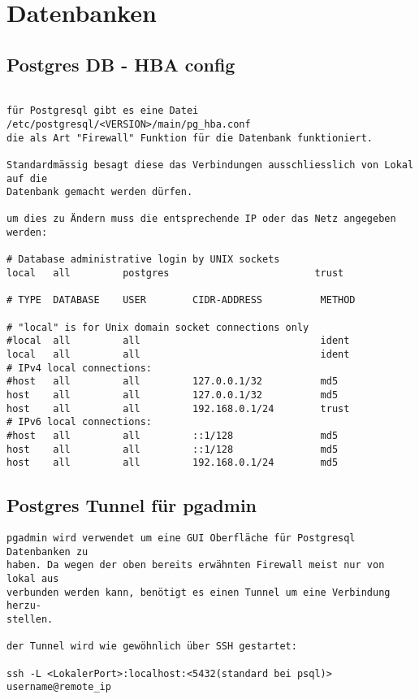 \documentclass[a4paper,10pt]{report}
\begin{document}
\chapter{Datenbanken}

\section{Postgres DB - HBA config}
\begin{verbatim}

für Postgresql gibt es eine Datei /etc/postgresql/<VERSION>/main/pg_hba.conf
die als Art "Firewall" Funktion für die Datenbank funktioniert.

Standardmässig besagt diese das Verbindungen ausschliesslich von Lokal auf die
Datenbank gemacht werden dürfen.

um dies zu Ändern muss die entsprechende IP oder das Netz angegeben werden:

# Database administrative login by UNIX sockets
local   all         postgres                         trust

# TYPE  DATABASE    USER        CIDR-ADDRESS          METHOD

# "local" is for Unix domain socket connections only
#local  all         all                               ident
local   all         all                               ident
# IPv4 local connections:
#host   all         all         127.0.0.1/32          md5
host    all         all         127.0.0.1/32          md5
host    all         all         192.168.0.1/24        trust
# IPv6 local connections:
#host   all         all         ::1/128               md5
host    all         all         ::1/128               md5
host    all         all         192.168.0.1/24        md5

\end{verbatim}
\pagebreak
\section{Postgres Tunnel für pgadmin}
\begin{verbatim}
pgadmin wird verwendet um eine GUI Oberfläche für Postgresql Datenbanken zu 
haben. Da wegen der oben bereits erwähnten Firewall meist nur von lokal aus 
verbunden werden kann, benötigt es einen Tunnel um eine Verbindung herzu-
stellen.

der Tunnel wird wie gewöhnlich über SSH gestartet:

ssh -L <LokalerPort>:localhost:<5432(standard bei psql)> username@remote_ip 
\end{verbatim}
\end{document}
